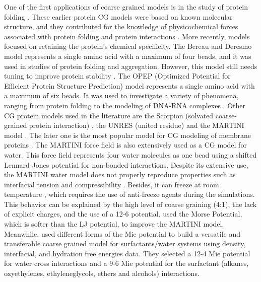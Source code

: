 One of the first applications of coarse grained models is in the study of protein folding \cite{levitt1975,levitt1976}. These earlier protein CG models were based on known molecular structure, and they contributed for the knowledge of physicochemical forces associated with protein folding and protein interactions \cite{koga2001}.  More recently, models focused on retaining the protein's chemical specificity. The Bereau and Deresmo model \cite{bereau2009} represents a single amino acid with a maximum of four beads, and it was used in studies of protein folding and aggregation. However, this model still needs tuning to improve protein stability \cite{bereau2010}. The OPEP (Optimized Potential for Efficient Protein Structure Prediction) model \cite{opep2014,opep2015} represents a single amino acid with a maximum of six beads. It was used to investigate a variety of phenomena, ranging from protein folding to the modeling of DNA-RNA complexes \cite{opep2011,opep2009,opep2014}. Other CG protein models used in the literature are the Scorpion (solvated coarse-grained protein interaction)  \cite{scorpion2013}, the UNRES (united residue) \cite{unres2014} and the MARTINI model \cite{martini2013}. The later one is the most popular model for CG modeling of membrane proteins \cite{martini20132}. The MARTINI force field is also extensively used as a CG model for water. This force field represents four water molecules as one bead using a shifted Lennard-Jones potential for non-bonded interactions. Despite its extensive use, the MARTINI water model does not properly reproduce properties such as interfacial tension and compressibility \cite{shinoda2010}. Besides, it can freeze at room temperature \cite{winger2009,martini2007}, which requires the use of anti-freeze agents during the simulations. This behavior can be explained by the high level of coarse graining (4:1), the lack of explicit charges, and the use of a 12-6 potential.  used the Morse Potential, which is softer than the LJ potential, to improve the MARTINI model. Meanwhile,  used different forms of the Mie potential to build a versatile and transferable coarse grained model for surfactants/water systems using density, interfacial, and hydration free energies data. They selected a 12-4 Mie potential for water cross interactions and  a 9-6 Mie potential for the surfactant (alkanes, oxyethylenes, ethyleneglycols, ethers and alcohols) interactions.

